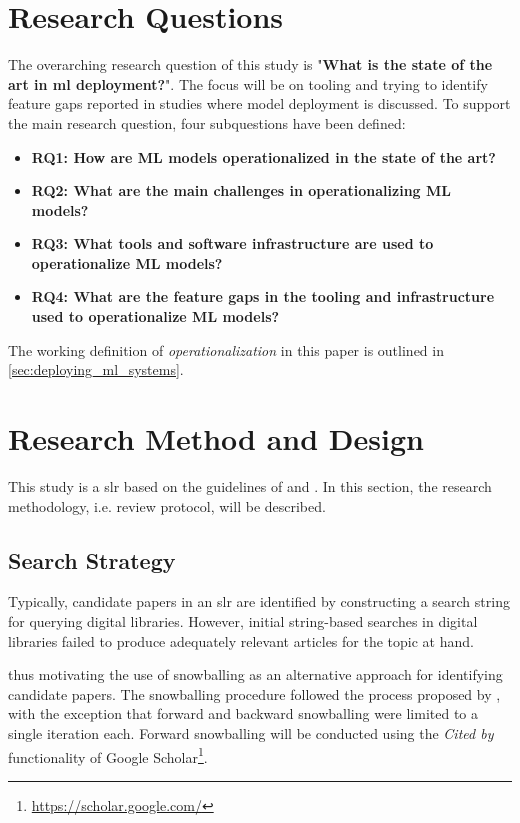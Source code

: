 \section{Research Questions}
\label{sec:research_questions}
The overarching research question of this study is "\textbf{What is the state of the art in \acrshort{ml} deployment?}".
The focus will be on tooling and trying to identify feature gaps reported in studies where model deployment is discussed.
To support the main research question, four subquestions have been defined:
\begin{itemize}
    \item \textbf{RQ1: How are ML models operationalized in the state of the art?}
    \item \textbf{RQ2: What are the main challenges in operationalizing ML models?}
    \item \textbf{RQ3: What tools and software infrastructure are used to operationalize ML models?}
    \item \textbf{RQ4: What are the feature gaps in the tooling and infrastructure used to operationalize ML models?}
\end{itemize}
The working definition of \emph{operationalization} in this paper is outlined in \cref{sec:deploying_ml_systems}.

\section{Research Method and Design}
\label{sec:research_method}
This study is a \acrfull{slr} based on the guidelines of \textcite{Kitchenham07guidelinesfor} and \textcite{Wohlin2014}.
In this section, the research methodology, i.e. review protocol, will be described.

\subsection{Search Strategy}
Typically, candidate papers in an \acrshort{slr} are identified by constructing a search string for querying digital libraries.
However, initial string-based searches in digital libraries failed to produce adequately relevant articles for the topic at hand.

thus motivating the use of snowballing as an alternative approach for identifying candidate papers.
The snowballing procedure followed the process proposed by \textcite{Wohlin2014}, with the exception that forward and backward snowballing were limited to a single iteration each.
Forward snowballing will be conducted using the \emph{Cited by} functionality of Google Scholar\footnote{\url{https://scholar.google.com/}}.

